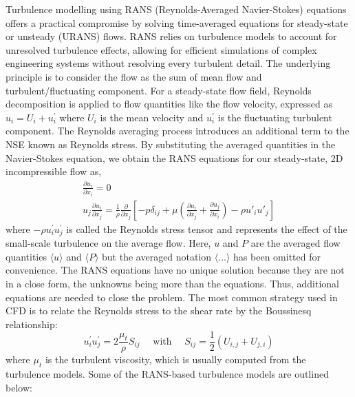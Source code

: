 Turbulence modelling using RANS (Reynolds-Averaged Navier-Stokes) equations offers a practical compromise by solving time-averaged equations for steady-state or unsteady (URANS) flows. RANS relies on turbulence models to account for unresolved turbulence effects, allowing for efficient simulations of complex engineering systems without resolving every turbulent detail. The underlying principle is to consider the flow as the sum of mean flow and turbulent/fluctuating component. For a steady-state flow field, Reynolds decomposition is applied to flow quantities like the flow velocity, expressed as $u_i = U_i + u_i^{\prime}$ where $U_i$ is the mean velocity and $u_i^{\prime}$ is the fluctuating turbulent component. The Reynolds averaging process introduces an additional term to the NSE known as Reynolds stress.  By substituting the averaged quantities in the Navier-Stokes equation, we obtain the RANS equations for our steady-state, 2D incompressible flow as,
\begin{equation}
  \begin{aligned}
  \frac{\partial u_i}{\partial x_i}=0 \\
  u_j \frac{\partial u_i}{\partial x_j}=\frac{1}{\rho}\frac{\partial}{\partial x_j}     \left[-p \delta_{i j}+\mu \left(\frac{\partial u_i}{\partial x_j}+\frac{\partial u_j}{\partial x_i}\right) - \rho u'_i u'_j \right]
  \end{aligned}
\end{equation}
where $- \rho u_i^{\prime} u_j^{\prime}$ is called the Reynolds stress tensor and represents the effect of the small-scale turbulence on the average flow. Here, $u$ and $P$ are the averaged flow quantities $\langle u \rangle $ and $\langle P \rangle $ but the averaged notation $\langle ... \rangle $ has been omitted for convenience. The RANS equations have no unique solution because they are not in a close form, the unknowns being more than the equations. Thus, additional equations are needed to close the problem. The most common strategy used in CFD is to relate the Reynolds stress to the shear rate by the Boussinesq relationship:
\begin{equation}
  u_i^{\prime} u_j^{\prime}=2 \frac{\mu_t}{\rho} S_{i j} \quad \text { with } \quad S_{i j}=\frac{1}{2}\left(U_{i, j}+U_{j, i}\right)
\end{equation}
where $\mu_t$ is the turbulent viscosity, which is usually computed from the turbulence models. Some of the RANS-based turbulence models are outlined below: 
